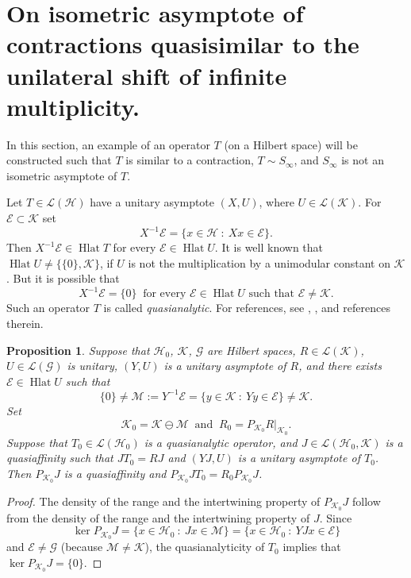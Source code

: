 \documentclass[a4paper,oneside,11pt]{amsart}
\numberwithin{equation}{section}
\theoremstyle{plain}
\newtheorem{proposition}[theorem]{Proposition}
\theoremstyle{definition}
\begin{document}
\section{On isometric asymptote of contractions quasisimilar to the unilateral shift of infinite multiplicity. }

In this section, an example of an operator $T$ (on a Hilbert space) will be constructed such that $T$ is similar to a contraction, $T\sim S_\infty$, and $S_\infty$ is not an isometric asymptote of $T$. 

Let $T\in\mathcal L(\mathcal H)$ have a unitary asymptote $(X,U)$, where $U\in\mathcal L(\mathcal K)$. 
For $ \mathcal E\subset \mathcal K$ set 
$$X^{-1}\mathcal E =\{x\in\mathcal H\ :\ Xx\in\mathcal E \}.$$
Then $X^{-1}\mathcal E\in\operatorname{Hlat}T$ for every $\mathcal E\in\operatorname{Hlat}U$. 
It is well known that  $\operatorname{Hlat}U\neq\{\{0\},\mathcal K\}$, if $U$ is not the multiplication by a unimodular constant on 
 $\mathcal K$. But it is possible that 
\begin{equation}\label{defquasi} X^{-1}\mathcal E =\{0\} 
\ \text{ for every } \mathcal E\in\operatorname{Hlat}U \text{ such that }  \mathcal E\neq\mathcal K.
\end{equation}
Such an operator $T$ is called \emph{quasianalytic}. For references, see \cite{ker16},  \cite{kerntuple}, \cite{kersz} and references therein. 


\begin{proposition}\label{propjjttrr} 
Suppose that $\mathcal H_0$, $\mathcal K$, $\mathcal G$ are Hilbert spaces, 
$R\in\mathcal L(\mathcal K)$, $U\in\mathcal L(\mathcal G)$ is unitary,  $(Y, U)$ is a unitary asymptote of $R$, 
and there exists $\mathcal E\in \operatorname{Hlat}U$ such that 
$$\{0\}\neq\mathcal M:=Y^{-1}\mathcal E=\{y\in\mathcal K\ :\ Yy\in \mathcal E\}\neq\mathcal K.$$ 
Set $$\mathcal K_0=\mathcal K\ominus \mathcal M \ \text{ and }\  R_0=P_{\mathcal K_0}R|_{\mathcal K_0}.$$
Suppose that 
$T_0\in\mathcal L(\mathcal H_0)$ is a quasianalytic operator,  and 
 $J\in\mathcal L(\mathcal H_0,\mathcal K)$ is a quasiaffinity such that $JT_0=RJ$ and 
$(YJ, U)$ is a unitary asymptote of $T_0$.
Then $P_{\mathcal K_0}J$ is a quasiaffinity and  $P_{\mathcal K_0}JT_0=R_0P_{\mathcal K_0}J$. 
\end{proposition}

\begin{proof} The density of the range and the  intertwining property of $P_{\mathcal K_0}J$ follow from 
the density of the  range and the  intertwining property of $J$.
Since $$\ker P_{\mathcal K_0}J=\{x\in\mathcal H_0\ :\ Jx\in\mathcal M\}=
\{x\in\mathcal H_0\ :\ YJx\in\mathcal E\}$$ 
and $\mathcal E\neq \mathcal G$ (because $\mathcal M\neq\mathcal K$), the quasianalyticity of $T_0$ implies that  $\ker P_{\mathcal K_0}J=\{0\}.$ 
\end{proof}
\end{document}
